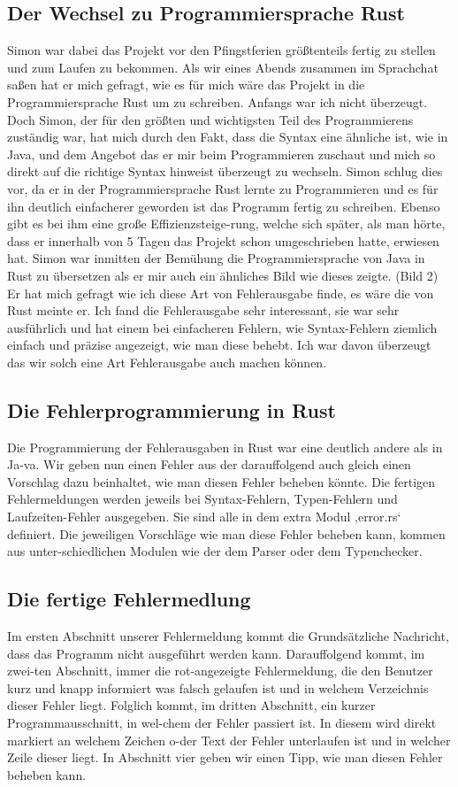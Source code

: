 \documentclass[a4paper, 12pt]{article}
\begin{document}
\subsection{Der Wechsel zu Programmiersprache Rust}
Simon war dabei das Projekt vor den Pfingstferien größtenteils fertig zu stellen und zum Laufen zu bekommen. Als wir eines Abends zusammen im Sprachchat saßen hat er mich gefragt, wie es für mich wäre das Projekt in die Programmiersprache Rust um zu schreiben. Anfangs war ich nicht überzeugt. Doch Simon, der für den größten und wichtigsten Teil des Programmierens zuständig war, hat mich durch den Fakt, dass die Syntax eine ähnliche ist, wie in Java, und dem Angebot das er mir beim Programmieren zuschaut und mich so direkt auf die richtige Syntax hinweist überzeugt zu wechseln. Simon schlug dies vor, da er in der Programmiersprache Rust lernte zu Programmieren und es für ihn deutlich einfacherer geworden ist das Programm fertig zu schreiben. Ebenso gibt es bei ihm eine große Effizienzsteige-rung, welche sich später, als man hörte, dass er innerhalb von 5 Tagen das Projekt schon umgeschrieben hatte, erwiesen hat. 
Simon war inmitten der Bemühung die Programmiersprache von Java in Rust zu übersetzen als er mir auch ein ähnliches Bild wie dieses zeigte. (Bild 2)
Er hat mich gefragt wie ich diese Art von Fehlerausgabe finde, es wäre die von Rust meinte er. Ich fand die Fehlerausgabe sehr interessant, sie war sehr ausführlich und hat einem bei einfacheren Fehlern, wie Syntax-Fehlern ziemlich einfach und präzise angezeigt, wie man diese behebt. Ich war davon überzeugt das wir solch eine Art Fehlerausgabe auch machen können. 
\subsection{Die Fehlerprogrammierung in Rust}
Die Programmierung der Fehlerausgaben in Rust war eine deutlich andere als in Ja-va. Wir geben nun einen Fehler aus der darauffolgend auch gleich einen Vorschlag dazu beinhaltet, wie man diesen Fehler beheben könnte.
Die fertigen Fehlermeldungen werden jeweils bei Syntax-Fehlern, Typen-Fehlern und Laufzeiten-Fehler ausgegeben. Sie sind alle in dem extra Modul ‚error.rs‘ definiert. Die jeweiligen Vorschläge wie man diese Fehler beheben kann, kommen aus unter-schiedlichen Modulen wie der dem Parser oder dem Typenchecker.
\subsection{Die fertige Fehlermedlung}
Im ersten Abschnitt unserer Fehlermeldung kommt die Grundsätzliche Nachricht, dass das Programm nicht ausgeführt werden kann. Darauffolgend kommt, im zwei-ten Abschnitt, immer die rot-angezeigte Fehlermeldung, die den Benutzer kurz und knapp informiert was falsch gelaufen ist und in welchem Verzeichnis dieser Fehler liegt. Folglich kommt, im dritten Abschnitt, ein kurzer Programmausschnitt, in wel-chem der Fehler passiert ist. In diesem wird direkt markiert an welchem Zeichen o-der Text der Fehler unterlaufen ist und in welcher Zeile dieser liegt. In Abschnitt vier geben wir einen Tipp, wie man diesen Fehler beheben kann. 
\end{document}
